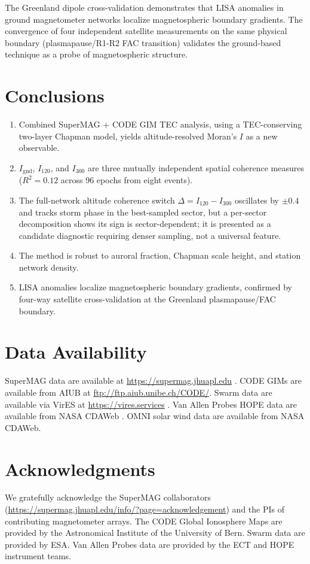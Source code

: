 \documentclass[11pt,letterpaper]{article}
\begin{document}
The Greenland dipole cross-validation demonstrates that LISA anomalies in ground
magnetometer networks localize magnetospheric boundary gradients. The convergence
of four independent satellite measurements on the same physical boundary
(plasmapause/R1-R2 FAC transition) validates the ground-based technique as a
probe of magnetospheric structure.

\section{Conclusions}

\begin{enumerate}
\item Combined SuperMAG + CODE GIM TEC analysis, using a TEC-conserving two-layer
  Chapman model, yields altitude-resolved Moran's $I$ as a new observable.
\item $I_\mathrm{gnd}$, $I_{120}$, and $I_{300}$ are three mutually independent
  spatial coherence measures ($R^2 = 0.12$ across 96 epochs from eight events).
\item The full-network altitude coherence switch $\Delta = I_{120} - I_{300}$
  oscillates by $\pm 0.4$ and tracks storm phase in the best-sampled sector, but a
  per-sector decomposition shows its sign is sector-dependent; it is presented as
  a candidate diagnostic requiring denser sampling, not a universal feature.
\item The method is robust to auroral fraction, Chapman scale height, and station
  network density.
\item LISA anomalies localize magnetospheric boundary gradients, confirmed by
  four-way satellite cross-validation at the Greenland plasmapause/FAC boundary.
\end{enumerate}

\section*{Data Availability}
SuperMAG data are available at \url{https://supermag.jhuapl.edu}
\citep{gjerloev2012supermag}. CODE GIMs are available from AIUB at
\url{ftp://ftp.aiub.unibe.ch/CODE/}. Swarm data are available via VirES at
\url{https://vires.services} \citep{knudsen2017thermal,xiong2014aob}. Van Allen
Probes HOPE data are available from NASA CDAWeb
\citep{funsten2013helium,spence2013science}. OMNI solar wind data are available
from NASA CDAWeb.

\section*{Acknowledgments}
We gratefully acknowledge the SuperMAG collaborators
(\url{https://supermag.jhuapl.edu/info/?page=acknowledgement}) and the PIs of
contributing magnetometer arrays. The CODE Global Ionosphere Maps are provided by
the Astronomical Institute of the University of Bern. Swarm data are provided by
ESA. Van Allen Probes data are provided by the ECT and HOPE instrument teams.


\end{document}
